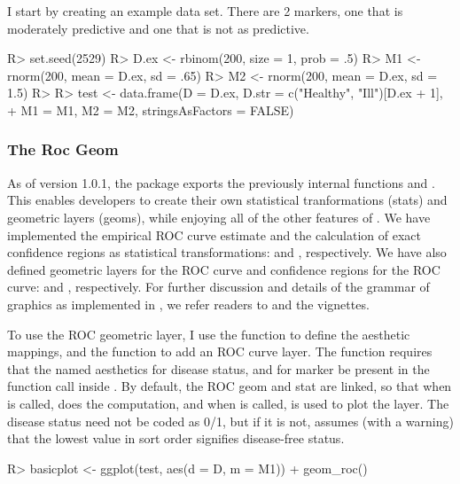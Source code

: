 \documentclass[codesnippet]{jss}
\begin{document}
I start by creating an example data set. There are 2 markers, one that
is moderately predictive and one that is not as predictive.

\begin{Schunk}
\begin{Sinput}
R> set.seed(2529)
R> D.ex <- rbinom(200, size = 1, prob = .5)
R> M1 <- rnorm(200, mean = D.ex, sd = .65)
R> M2 <- rnorm(200, mean = D.ex, sd = 1.5)
R> 
R> test <- data.frame(D = D.ex, D.str = c("Healthy", "Ill")[D.ex + 1], 
+                    M1 = M1, M2 = M2, stringsAsFactors = FALSE)
\end{Sinput}
\end{Schunk}

\subsubsection{The Roc Geom}\label{the-roc-geom}

As of version 1.0.1, the  package \citep{ggplot2} exports
the previously internal functions  and . This
enables developers to create their own statistical tranformations
(stats) and geometric layers (geoms), while enjoying all of the other
features of . We have implemented the empirical ROC curve
estimate and the calculation of exact confidence regions as statistical
transformations:  and , respectively. We
have also defined geometric layers for the ROC curve and confidence
regions for the ROC curve:  and ,
respectively. For further discussion and details of the grammar of
graphics as implemented in , we refer readers to
\citet{wickham2010layered} and the  vignettes.

To use the ROC geometric layer, I use the  function to
define the aesthetic mappings, and the  function to add
an ROC curve layer. The  function requires that the named
aesthetics  for disease status, and  for marker be
present in the  function call inside . By
default, the ROC geom and stat are linked, so that when 
is called,  does the computation, and when
 is called,  is used to plot the layer.
The disease status need not be coded as 0/1, but if it is not,
 assumes (with a warning) that the lowest value in sort
order signifies disease-free status.

\begin{Schunk}
\begin{Sinput}
R> basicplot <- ggplot(test, aes(d = D, m = M1)) + geom_roc()
\end{Sinput}
\end{Schunk}
\end{document}
